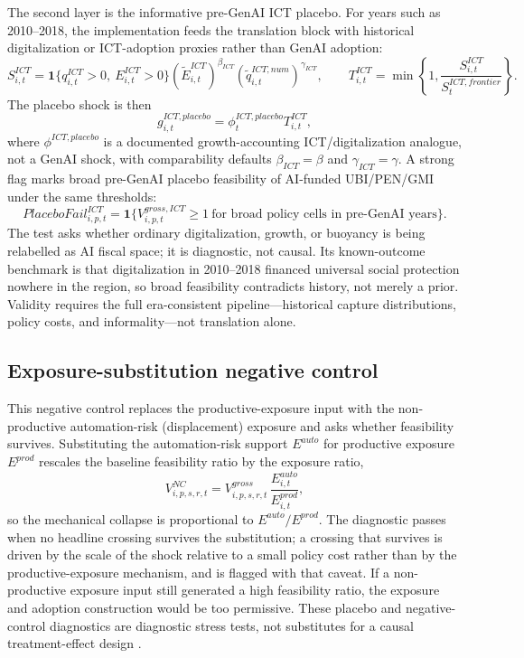 \documentclass[11pt,a4paper]{article}
\begin{document}
The second layer is the informative pre-GenAI ICT placebo. For years such as 2010--2018, the implementation feeds the translation block with historical digitalization or ICT-adoption proxies rather than GenAI adoption:
\begin{equation}
    S^{ICT}_{i,t}=\mathbf{1}\{q^{ICT}_{i,t}>0,\ E^{ICT}_{i,t}>0\}(\tilde E^{ICT}_{i,t})^{\beta_{ICT}}(\tilde q^{ICT,num}_{i,t})^{\gamma_{ICT}},
    \qquad
    T^{ICT}_{i,t}=\min\left\{1,\frac{S^{ICT}_{i,t}}{S^{ICT,frontier}_{t}}\right\}.
\end{equation}
The placebo shock is then
\begin{equation}
    g^{ICT,placebo}_{i,t}=\phi^{ICT,placebo}_{t}T^{ICT}_{i,t},
\end{equation}
where $\phi^{ICT,placebo}$ is a documented growth-accounting ICT/digitalization analogue, not a GenAI shock, with comparability defaults $\beta_{ICT}=\beta$ and $\gamma_{ICT}=\gamma$. A strong flag marks broad pre-GenAI placebo feasibility of AI-funded UBI/PEN/GMI under the same thresholds:
\begin{equation}
    PlaceboFail^{ICT}_{i,p,t}=\mathbf{1}\{V^{gross,ICT}_{i,p,t}\geq1\ \text{for broad policy cells in pre-GenAI years}\}.
\end{equation}
The test asks whether ordinary digitalization, growth, or buoyancy is being relabelled as AI fiscal space; it is diagnostic, not causal. Its known-outcome benchmark is that digitalization in 2010--2018 financed universal social protection nowhere in the region, so broad feasibility contradicts history, not merely a prior. Validity requires the full era-consistent pipeline---historical capture distributions, policy costs, and informality---not translation alone.

\subsection{Exposure-substitution negative control}

This negative control replaces the productive-exposure input with the non-productive
automation-risk (displacement) exposure and asks whether feasibility survives. Substituting the
automation-risk support $E^{auto}$ for productive exposure $E^{prod}$ rescales the baseline
feasibility ratio by the exposure ratio,
\begin{equation}
    V^{NC}_{i,p,s,r,t}=V^{gross}_{i,p,s,r,t}\,\frac{E^{auto}_{i,t}}{E^{prod}_{i,t}},
\end{equation}
so the mechanical collapse is proportional to $E^{auto}/E^{prod}$. The diagnostic passes when
no headline crossing survives the substitution; a crossing that survives is driven by the scale
of the shock relative to a small policy cost rather than by the productive-exposure mechanism,
and is flagged with that caveat. If a non-productive exposure input still generated a high
feasibility ratio, the exposure and adoption construction would be too permissive. These
placebo and negative-control diagnostics are diagnostic stress tests, not substitutes for a
causal treatment-effect design \citep{bertrand2004trust,athey2017state,lipsitch2010negative}.
\end{document}
